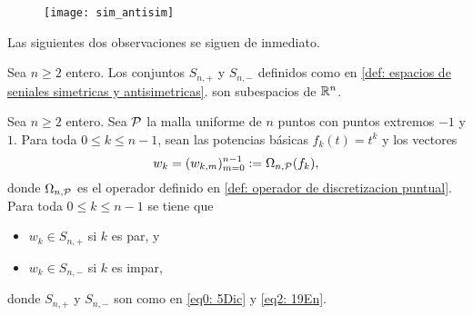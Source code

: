 \begin{figure}[H]
	\centering
	\texttt{[image: sim\_antisim]} 
\end{figure}	

\begin{comment}
{\Huge{$n$ par}}\\

{\Huge{$n$ impar}}\\

{\Huge{$x= (x_{0}, x_{1}, x_{2}, x_{3}, x_{4}, x_{5}) \in S_{6,+}$}}\\

{\Huge{$x= (x_{0}, x_{1}, x_{2}, x_{3}, x_{4}, x_{5}) \in S_{6,-}$}}\\

{\Huge{$x= (x_{0}, x_{1}, x_{2}, x_{3}, x_{4}) \in S_{5,+}$}}\\

{\Huge{$x= (x_{0}, x_{1}, x_{2}, x_{3}, x_{4}) \in S_{5,-}$}}\\
\end{comment}


Las siguientes dos observaciones se siguen de inmediato.
\begin{obs}
\label{obs: espacios de senales sim y antisim}
Sea $n \geq 2$ entero.  
Los conjuntos $S_{n,+}$ y $S_{n,-}$ definidos como en  
\ref{def: espacios de seniales simetricas y antisimetricas}. 
son subespacios de $\mathbb{R}^{n}$.
\end{obs}

\begin{obs}
\label{obs: pertenencia}
Sea $n \geq 2$ entero.  
Sea $\mathcal{P}$ la malla
uniforme de $n$ puntos con puntos extremos $-1$ y $1$.
Para toda $0 \leq k \leq n-1$, sean
las potencias básicas $f_{k}(t)=t^{k}$ y los vectores
\begin{equation}
\label{eq4: 10Dic}
w_{k}=(w_{k,m})_{m=0}^{n-1} := \Omega_{n, \mathcal{P}}(f_{k}),
\end{equation}
donde $\Omega_{n, \mathcal{P}}$ es el operador definido en 
\ref{def: operador de discretizacion puntual}.
Para toda $0 \leq k \leq n-1$ se tiene que
\begin{itemize}
\item $w_{k} \in S_{n,+}$ si $k$ es par, y
\item $w_{k} \in S_{n,-}$ si $k$ es impar,
\end{itemize}
donde $S_{n,+}$ y $S_{n,-}$ son como en 
\eqref{eq0: 5Dic} y \eqref{eq2: 19En}.
\end{obs}

